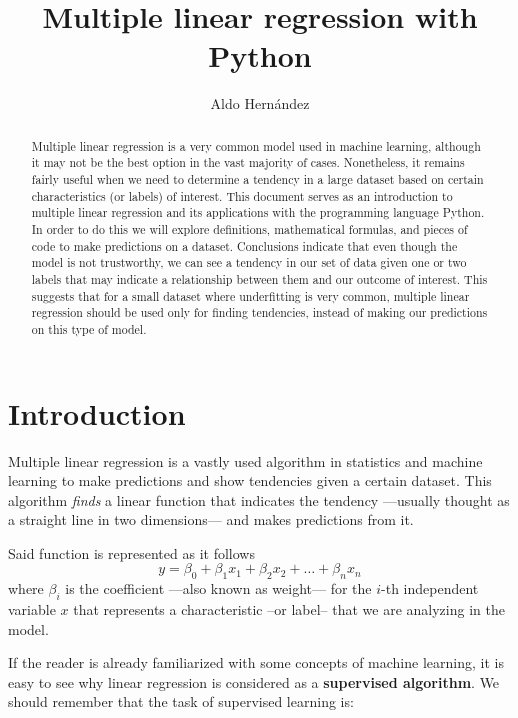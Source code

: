 \documentclass[10pt]{article}
\begin{document}
\begin{opening}
  \title{Multiple linear regression with Python}
  \author[Universidad Autónoma de Nuevo León, San Nicolás de los Garza, aldo.hernandezt@uanl.edu.mx]{Aldo Hernández}

  \begin{abstract}
    Multiple linear regression is a very common model used in machine learning, although it may not be the best option in the vast majority of cases. Nonetheless, it remains fairly useful when we need to determine a tendency in a large dataset based on certain characteristics (or labels) of interest. This document serves as an introduction to multiple linear regression and its applications with the programming language Python. In order to do this we will explore definitions, mathematical formulas, and pieces of code to make predictions on a dataset. Conclusions indicate that even though the model is not trustworthy, we can see a tendency in our set of data given one or two labels that may indicate a relationship between them and our outcome of interest. This suggests that for a small dataset where underfitting is very common, multiple linear regression should be used only for finding tendencies, instead of making our predictions on this type of model.
  \end{abstract}

\end{opening}

\section{Introduction}
Multiple linear regression is a vastly used algorithm in statistics and machine learning to make predictions and show tendencies given a certain dataset. This algorithm \textit{finds} a linear function that indicates the tendency ---usually thought as a straight line in two dimensions--- and makes predictions from it. \cite{aprendeML} \par
Said function is represented as it follows
\begin{equation*}
    y = \beta_{0} + \beta_{1}x_{1} + \beta_{2}x_{2} + \dots + \beta_{n}x_{n}
\end{equation*}
where $\beta_{i}$ is the coefficient ---also known as weight--- for the $i$-th independent variable $x$ that represents a characteristic --or label-- that we are analyzing in the model. \par
If the reader is already familiarized with some concepts of machine learning, it is easy to see why linear regression is considered as a \textbf{supervised algorithm}. We should remember that the task of supervised learning is:
\vspace{5pt}
\end{document}
